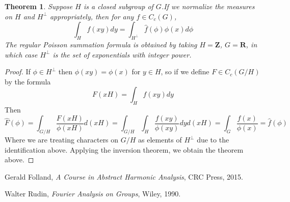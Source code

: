 \documentclass{article}
\theoremstyle{plain}
\newtheorem{theorem}{Theorem}
\theoremstyle{definition}
\begin{document}
\begin{theorem}
    Suppose $H$ is a closed subgroup of $G$.If we normalize the measures on $H$ and $H^\perp$ appropriately, then for any $f \in C_c(G)$,
    \[ \int_H f(xy) dy = \int_{H^\perp} \hat{f}(\phi) \phi(x) d\phi \]
    The regular Poisson summation formula is obtained by taking $H = \mathbf{Z}$, $G = \mathbf{R}$, in which case $H^\perp$ is the set of exponentials with integer power.
\end{theorem}
\begin{proof}
    If $\phi \in H^\perp$ then $\phi(xy) = \phi(x)$ for $y \in H$, so if we define $F \in C_c(G/H)$ by the formula
    \[ F(xH) = \int_H f(xy) dy \]
    Then
    \[ \hat{F}(\phi) = \int_{G/H} \frac{F(xH)}{\phi(xH)} d(xH) = \int_{G/H} \int_H \frac{f(xy)}{\phi(xy)} dy d(xH) = \int_G \frac{f(x)}{\phi(x)} = \hat{f}(\phi) \]
    Where we are treating characters on $G/H$ as elements of $H^\perp$ due to the identification above. Applying the inversion theorem, we obtain the theorem above.
\end{proof}

\begin{thebibliography}{9}

    Gerald Folland,
    \emph{A Course in Abstract Harmonic Analysis},
    CRC Press,
    2015.

    Walter Rudin,
    \emph{Fourier Analysis on Groups},
    Wiley,
    1990.

\end{thebibliography}
\end{document}
